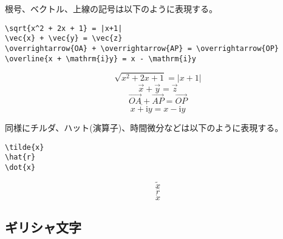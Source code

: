 根号、ベクトル、上線の記号は以下のように表現する。
\begin{reidai}
\begin{verbatim}
\sqrt{x^2 + 2x + 1} = |x+1|
\vec{x} + \vec{y} = \vec{z}
\overrightarrow{OA} + \overrightarrow{AP} = \overrightarrow{OP}
\overline{x + \mathrm{i}y} = x - \mathrm{i}y
\end{verbatim}
\end{reidai}
\vspace*{-1.5em}
\begin{kekka}
  \begin{equation*}
    \sqrt{x^2 + 2x + 1} = |x+1|
  \end{equation*}
  \begin{equation*}
    \vec{x} + \vec{y} = \vec{z}
  \end{equation*}
  \begin{equation*}
    \overrightarrow{OA} + \overrightarrow{AP} = \overrightarrow{OP}
  \end{equation*}
  \begin{equation*}
    \overline{x + \mathrm{i}y} = x - \mathrm{i}y
  \end{equation*}
\end{kekka} \noindent
同様にチルダ、ハット(演算子)、時間微分などは以下のように表現する。
\begin{reidai}
\begin{verbatim}
\tilde{x}
\hat{r}
\dot{x}
\end{verbatim}
\end{reidai}
\vspace*{-1.5em}
\begin{kekka}
  \begin{equation*}
    \tilde{x}
  \end{equation*}
  \begin{equation*}
    \hat{r}
  \end{equation*}
  \begin{equation*}
    \dot{x}
  \end{equation*}
\end{kekka}

\subsection{ギリシャ文字}
\label{sec:latex:greek}

